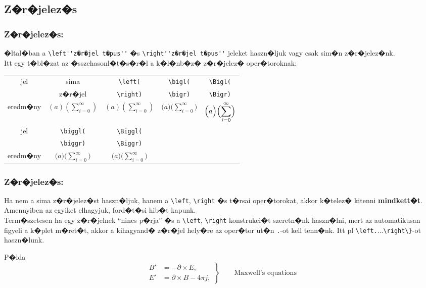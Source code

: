 \documentclass[xcolor=pdftex,dvipsnames,table,compress,bigger]{beamer}
\begin{document}
\subsection{Z�r�jelez�s}
\begin{frame}[fragile]
    \frametitle{Z�r�jelez�s:}
    �ltal�ban a \verb*|\left''z�r�jel t�pus''| �s \verb*|\right''z�r�jel t�pus''| jeleket haszn�ljuk vagy csak sim�n
    z�r�jelez�nk.\\
    Itt egy t�bl�zat az �sszehasonl�t�s�r�l a k�l�nb�z� z�r�jelez� oper�toroknak:
    \begin{tabular}{c|cccc}
    jel & sima    & \verb*|\left(|  & \verb*|\bigl(|  & \verb*|\Bigl(|  \\
        & z�r�jel & \verb*|\right)| & \verb*|\bigr)|  & \verb*|\Bigr)|  \\
    \hline 
    eredm�ny & 
    $\displaystyle(a)(\sum_{i=0}^{\infty})$ & 
    $\displaystyle \left(a\right)\left(\sum_{i=0}^{\infty}\right)$ & 
    $\displaystyle \bigl(a\bigr)\bigl(\sum_{i=0}^{\infty}\bigr)$ &
    $\displaystyle \Bigl(a\Bigr)\Bigl(\sum_{i=0}^{\infty}\Bigr)$ \\
    \hline
    \hline
    jel &  \verb*|\biggl(|  & \verb*|\Biggl(| &&\\ 
    	  &  \verb*|\biggr)|  & \verb*|\Biggr)| &&\\
    \hline
    eredm�ny &
    $\displaystyle \biggl(a\biggr)\biggl(\sum_{i=0}^{\infty}\biggr)$ &
    $\displaystyle \Biggl(a\Biggr)\Biggl(\sum_{i=0}^{\infty}\Biggr)$ \\
    \end{tabular}
\end{frame}

\begin{frame}[fragile]
    \frametitle{Z�r�jelez�s:}
    Ha nem a sima z�r�jelez�st haszn�ljuk, hanem a \verb*|\left|, \verb*|\right| �s t�rsai oper�torokat, akkor k�telez� kitenni {\bf mindkett�t}. Amennyiben az egyiket elhagyjuk, ford�t�si hib�t kapunk.\\
    Term�szetesen ha egy z�r�jelnek ``nincs p�rja'' �s a \verb*|\left|, \verb*|\right| konstrukci�t szeretn�nk haszn�lni, mert az automatikusan figyeli a k�plet m�ret�t, akkor a kihagyand� z�r�jel hely�re az oper�tor ut�n \verb*|.|-ot kell tenn�nk. Itt pl \verb*|\left.|$\ldots$\verb*|\right\}|-ot haszn�lunk.
    \begin{block}{P�lda}
    \begin{equation}
\left.\begin{aligned}
B'&=-\partial\times E,\\
E'&=\partial\times B - 4\pi j,
\end{aligned}
\right\}
\qquad \text{Maxwell's equations}
\end{equation}
    \end{block}
\end{frame}
\end{document}
